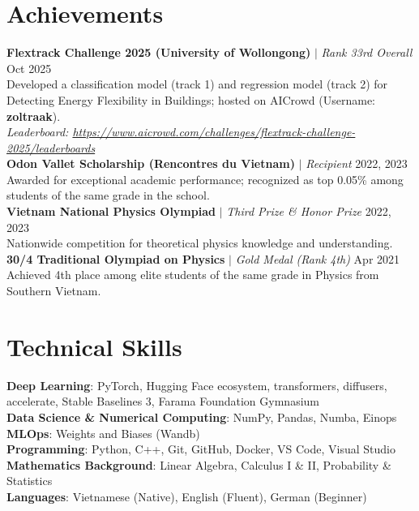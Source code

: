 \documentclass[letterpaper,11pt]{article}
\begin{document}
\section{Achievements}
 \begin{itemize}[leftmargin=0.15in, label={}]
    \small{\item{
     \textbf{Flextrack Challenge 2025 (University of Wollongong)} $|$ \emph{Rank 33rd Overall} \hfill Oct 2025 \\
     Developed a classification model (track 1) and regression model (track 2) for Detecting Energy Flexibility in Buildings; hosted on AICrowd (Username: \textbf{zoltraak}). \\
     \textit{Leaderboard: \url{https://www.aicrowd.com/challenges/flextrack-challenge-2025/leaderboards}} \vspace{1mm} \\
     
     \textbf{Odon Vallet Scholarship (Rencontres du Vietnam)} $|$ \emph{Recipient} \hfill 2022, 2023 \\
     Awarded for exceptional academic performance; recognized as top 0.05\% among students of the same grade in the school. \vspace{1mm} \\
     
     \textbf{Vietnam National Physics Olympiad} $|$ \emph{Third Prize \& Honor Prize} \hfill 2022, 2023 \\
     Nationwide competition for theoretical physics knowledge and understanding. \vspace{1mm} \\
     
     \textbf{30/4 Traditional Olympiad on Physics} $|$ \emph{Gold Medal (Rank 4th)} \hfill Apr 2021 \\
     Achieved 4th place among elite students of the same grade in Physics from Southern Vietnam.
    }}
 \end{itemize}


%
\section{Technical Skills}
 \begin{itemize}[leftmargin=0.15in, label={}]
    \small{\item{
     \textbf{Deep Learning}{: PyTorch, Hugging Face ecosystem, transformers, diffusers, accelerate, Stable Baselines 3, Farama Foundation Gymnasium } \\
     \textbf{Data Science \& Numerical Computing}{: NumPy, Pandas, Numba, Einops } \\
     \textbf{MLOps}{: Weights and Biases (Wandb) } \\
     \textbf{Programming}{: Python, C++, Git, GitHub, Docker, VS Code, Visual Studio} \\
     \textbf{Mathematics Background}{: Linear Algebra, Calculus I \& II, Probability \& Statistics} \\
     \textbf{Languages}{: Vietnamese (Native), English (Fluent), German (Beginner) }
    }}
 \end{itemize}

\end{document}
